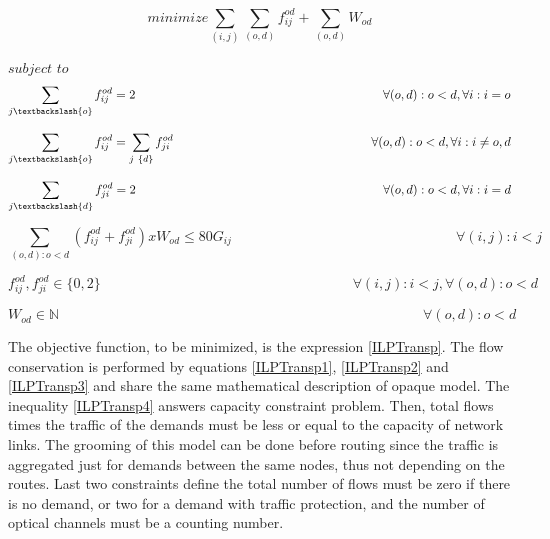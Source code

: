 \newpage

\begin{equation}
minimize    \sum_{(i,j)} \sum_{(o,d)} f_{ij}^{od} + \sum_{(o,d)} W_{od}
\label{ILPTransp}
\end{equation}

$subject$ $to$
\begin{equation}
\sum_{j\textbackslash \{o\}} f_{ij}^{od} = 2  \qquad \qquad \qquad \qquad \qquad \qquad \qquad \qquad \qquad \qquad
\forall(o,d) : o < d, \forall i: i = o
\label{ILPTransp1}
\end{equation}

\begin{equation}
\sum_{j\textbackslash \{o\}} f_{ij}^{od} = \sum_{j\ \{d\}} f_{ji}^{od}   \qquad \qquad \qquad \qquad \qquad \qquad \qquad \qquad
\forall(o,d) : o < d, \forall i: i \neq o,d
\label{ILPTransp2}
\end{equation}

\begin{equation}
\sum_{j\textbackslash \{d\}} f_{ji}^{od} = 2  \qquad \qquad \qquad \qquad \qquad \qquad \qquad \qquad \qquad \qquad
\forall(o,d) : o < d, \forall i: i = d
\label{ILPTransp3}
\end{equation}

\begin{equation}
\sum_{(o,d):o<d} \left(f_{ij}^{od} + f_{ji}^{od}\right) x W_{od} \leq 80 G_{ij} \qquad \qquad \qquad \qquad \qquad \qquad \qquad \qquad
\forall(i,j) : i < j
\label{ILPTransp4}
\end{equation}

\begin{equation}
f_{ij}^{od} , f_{ji}^{od} \in \{0,2\}   \qquad \qquad \qquad \qquad \qquad \qquad \qquad \qquad \qquad
\forall(i,j) : i < j, \forall(o,d) : o < d
\label{ILPTransp5}
\end{equation}

\begin{equation}
W_{od} \in \mathbb{N}  \qquad \qquad \qquad \qquad \qquad \qquad \qquad \qquad \qquad \qquad \qquad \qquad \qquad
\forall(o,d) : o < d
\label{ILPTransp6}
\end{equation}

\vspace{10pt}

The objective function, to be minimized, is the expression \ref{ILPTransp}. The flow conservation is performed by equations \ref{ILPTransp1}, \ref{ILPTransp2} and \ref{ILPTransp3} and share the same mathematical description of opaque model. The inequality \ref{ILPTransp4} answers capacity constraint problem. Then, total flows times the traffic of the demands must be less or equal to the capacity of network links. The grooming of this model can be done before routing since the traffic is aggregated just for demands between the same nodes, thus not depending on the routes. Last two constraints define the total number of flows must be zero if there is no demand, or two for a demand with traffic protection, and the number of optical channels must be a counting number.

